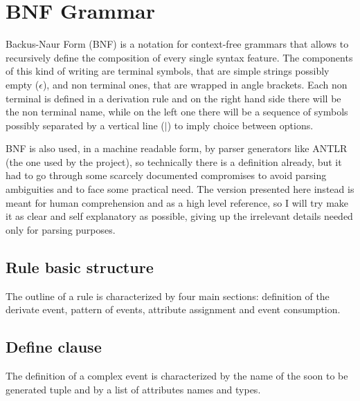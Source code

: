 \section{BNF Grammar}

Backus-Naur Form (BNF) is a notation for context-free grammars that allows to recursively define the composition of every single syntax feature. The components of this kind of writing are terminal symbols, that are simple strings possibly empty ($\epsilon$), and non terminal ones, that are wrapped in angle brackets. Each non terminal is defined in a derivation rule and on the right hand side there will be the non terminal name, while on the left one there will be a sequence of symbols possibly separated by a vertical line ($|$) to imply choice between options.

BNF is also used, in a machine readable form, by parser generators like ANTLR (the one used by the project), so technically there is a definition already, but it had to go through some scarcely documented compromises to avoid parsing ambiguities and to face some practical need. The version presented here instead is meant for human comprehension and as a high level reference, so I will try make it as clear and self explanatory as possible, giving up the irrelevant details needed only for parsing purposes.

\subsection{Rule basic structure}
The outline of a rule is characterized by four main sections: definition of the derivate event, pattern of events, attribute assignment and event consumption.
\begin{bnf*}
\end{bnf*}

\subsection{Define clause}
The definition of a complex event is characterized by the name of the soon to be generated tuple and by a list of attributes names and types.
\begin{bnf*}
\end{bnf*}
\begin{bnf*}
\\
\\
\\
\end{bnf*}

